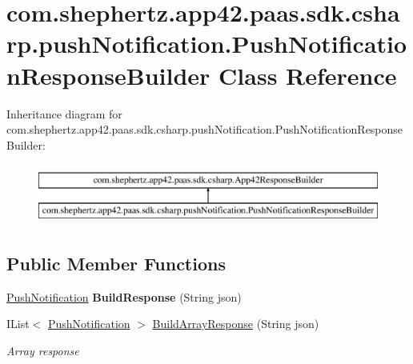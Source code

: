 \hypertarget{classcom_1_1shephertz_1_1app42_1_1paas_1_1sdk_1_1csharp_1_1push_notification_1_1_push_notification_response_builder}{\section{com.\+shephertz.\+app42.\+paas.\+sdk.\+csharp.\+push\+Notification.\+Push\+Notification\+Response\+Builder Class Reference}
\label{classcom_1_1shephertz_1_1app42_1_1paas_1_1sdk_1_1csharp_1_1push_notification_1_1_push_notification_response_builder}
}
Inheritance diagram for com.\+shephertz.\+app42.\+paas.\+sdk.\+csharp.\+push\+Notification.\+Push\+Notification\+Response\+Builder\+:\begin{figure}[H]
\begin{center}
\leavevmode
\includegraphics[height=2.000000cm]{classcom_1_1shephertz_1_1app42_1_1paas_1_1sdk_1_1csharp_1_1push_notification_1_1_push_notification_response_builder}
\end{center}
\end{figure}
\subsection*{Public Member Functions}
\begin{DoxyCompactItemize}
\item 
\hypertarget{classcom_1_1shephertz_1_1app42_1_1paas_1_1sdk_1_1csharp_1_1push_notification_1_1_push_notification_response_builder_a9bd411f89f8e148fd297a838eff59870}{\hyperlink{classcom_1_1shephertz_1_1app42_1_1paas_1_1sdk_1_1csharp_1_1push_notification_1_1_push_notification}{Push\+Notification} {\bfseries Build\+Response} (String json)}\label{classcom_1_1shephertz_1_1app42_1_1paas_1_1sdk_1_1csharp_1_1push_notification_1_1_push_notification_response_builder_a9bd411f89f8e148fd297a838eff59870}

\item 
I\+List$<$ \hyperlink{classcom_1_1shephertz_1_1app42_1_1paas_1_1sdk_1_1csharp_1_1push_notification_1_1_push_notification}{Push\+Notification} $>$ \hyperlink{classcom_1_1shephertz_1_1app42_1_1paas_1_1sdk_1_1csharp_1_1push_notification_1_1_push_notification_response_builder_a0bfe6828587649edbaac0532e976a61c}{Build\+Array\+Response} (String json)
\begin{DoxyCompactList}\small\item\em Array response \end{DoxyCompactList}\end{DoxyCompactItemize}



